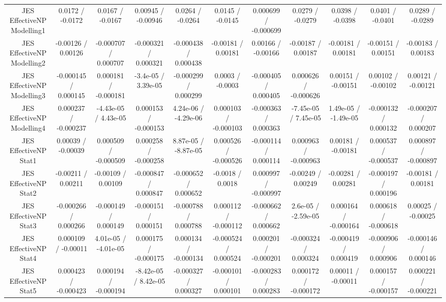 \begin{table}[htbp]
\begin{center}
\begin{tabular}{|c|c|c|c|c|c|c|c|c|c|c|}
  JES EffectiveNP Modelling1 & 0.0172 / -0.0172 & 0.0167 / -0.0167 & 0.00945 / -0.00946 & 0.0264 / -0.0264 & 0.0145 / -0.0145 & 0.000699 / -0.000699 & 0.0279 / -0.0279 & 0.0398 / -0.0398 & 0.0401 / -0.0401 & 0.0289 / -0.0289 \\ 
  JES EffectiveNP Modelling2 & -0.00126 / 0.00126 & -0.000707 / 0.000707 & -0.000321 / 0.000321 & -0.000438 / 0.000438 & -0.00181 / 0.00181 & 0.00166 / -0.00166 & -0.00187 / 0.00187 & -0.00181 / 0.00181 & -0.00151 / 0.00151 & -0.00183 / 0.00183 \\ 
  JES EffectiveNP Modelling3 & -0.000145 / 0.000145 & 0.000181 / -0.000181 & -3.4e-05 / 3.39e-05 & -0.000299 / 0.000299 & 0.0003 / -0.0003 & -0.000405 / 0.000405 & 0.000626 / -0.000626 & 0.00151 / -0.00151 & 0.00102 / -0.00102 & 0.00121 / -0.00121 \\ 
  JES EffectiveNP Modelling4 & 0.000237 / -0.000237 & -4.43e-05 / 4.43e-05 & 0.000153 / -0.000153 & 4.24e-06 / -4.29e-06 & 0.000103 / -0.000103 & -0.000363 / 0.000363 & -7.45e-05 / 7.45e-05 & 1.49e-05 / -1.49e-05 & -0.000132 / 0.000132 & -0.000207 / 0.000207 \\ 
  JES EffectiveNP Stat1 & 0.00039 / -0.00039 & 0.000509 / -0.000509 & 0.000258 / -0.000258 & 8.87e-05 / -8.87e-05 & 0.000526 / -0.000526 & -0.000114 / 0.000114 & 0.000963 / -0.000963 & 0.00181 / -0.00181 & 0.000537 / -0.000537 & 0.000897 / -0.000897 \\ 
  JES EffectiveNP Stat2 & -0.00211 / 0.00211 & -0.00109 / 0.00109 & -0.000847 / 0.000847 & -0.000652 / 0.000652 & -0.0018 / 0.0018 & 0.000997 / -0.000997 & -0.00249 / 0.00249 & -0.00281 / 0.00281 & -0.000197 / 0.000196 & -0.00181 / 0.00181 \\ 
  JES EffectiveNP Stat3 & -0.000266 / 0.000266 & -0.000149 / 0.000149 & -0.000151 / 0.000151 & -0.000788 / 0.000788 & 0.000112 / -0.000112 & -0.000662 / 0.000662 & 2.6e-05 / -2.59e-05 & 0.000164 / -0.000164 & 0.000618 / -0.000618 & 0.00025 / -0.00025 \\ 
  JES EffectiveNP Stat4 & 0.000109 / -0.00011 & 4.01e-05 / -4.01e-05 & 0.000175 / -0.000175 & 0.000134 / -0.000134 & -0.000524 / 0.000524 & 0.000201 / -0.000201 & -0.000324 / 0.000324 & -0.000419 / 0.000419 & -0.000906 / 0.000906 & -0.000146 / 0.000146 \\ 
  JES EffectiveNP Stat5 & 0.000423 / -0.000423 & 0.000194 / -0.000194 & -8.42e-05 / 8.42e-05 & -0.000327 / 0.000327 & -0.000101 / 0.000101 & -0.000283 / 0.000283 & 0.000172 / -0.000172 & 0.00011 / -0.00011 & 0.000157 / -0.000157 & 0.000221 / -0.000221 \\ 

\end{tabular}
\end{center}
\end{table}
